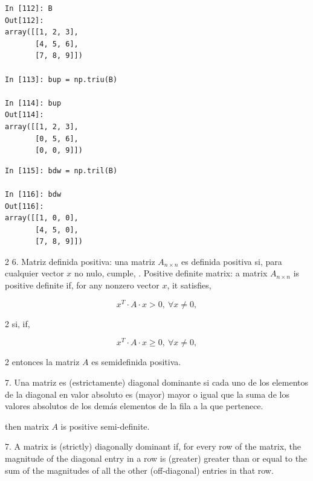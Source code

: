 \begin{center}
	\begin{minipage}{0.3\textwidth}
		\begin{verbatim}
In [112]: B
Out[112]: 
array([[1, 2, 3],
       [4, 5, 6],
       [7, 8, 9]])

In [113]: bup = np.triu(B)

In [114]: bup
Out[114]: 
array([[1, 2, 3],
       [0, 5, 6],
       [0, 0, 9]])
		\end{verbatim}
\end{minipage}
\end{center}
\begin{center}
	\begin{minipage}{0.3\textwidth}
		\begin{verbatim}
In [115]: bdw = np.tril(B)

In [116]: bdw
Out[116]: 
array([[1, 0, 0],
       [4, 5, 0],
       [7, 8, 9]])
		\end{verbatim}
	\end{minipage}
\end{center}

\begin{paracol}{2}
6. Matriz definida positiva: una matriz $A_{n \times n}$ es definida positiva si, para cualquier vector $x$ no nulo, cumple,
. Positive definite matrix: a matrix $A_{n\times n}$ is positive definite if, for any nonzero vector $x$, it satisfies,
\end{paracol}
\begin{equation*}
x^T\cdot A \cdot x > 0, \ \forall x\neq 0,
\end{equation*}
\begin{paracol}{2}
si,
\switchcolumn
if,
\end{paracol}
\begin{equation*}
x^T\cdot A \cdot x \geq 0, \ \forall x\neq 0,
\end{equation*}

\begin{paracol}{2}
entonces la matriz $A$ es semidefinida positiva.

7. Una matriz es (estrictamente) diagonal dominante si cada uno de los elementos de la diagonal en valor absoluto es  (mayor) mayor o igual que la suma de los valores absolutos de los demás elementos de la fila a la que pertenece.

\switchcolumn
then matrix $A$ is positive semi-definite.

7. A matrix is (strictly) diagonally dominant if, for every row of the matrix, the magnitude of the diagonal entry in a row is (greater) greater than or equal to the sum of the magnitudes of all the other (off-diagonal) entries in that row.
\end{paracol}

